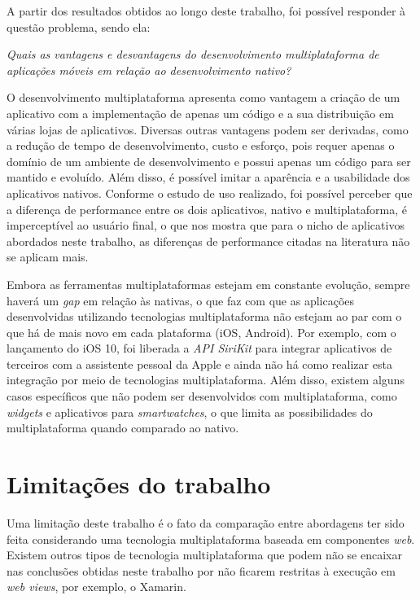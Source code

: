 A partir dos resultados obtidos ao longo deste trabalho, foi possível responder à questão problema, sendo ela:
\begin{center}
    \textit{Quais as vantagens e desvantagens do desenvolvimento multiplataforma de aplicações móveis em relação ao desenvolvimento nativo?}
\end{center}

O desenvolvimento multiplataforma apresenta como vantagem a criação de um aplicativo com a implementação de apenas um código e a sua distribuição em várias lojas de aplicativos. Diversas outras vantagens podem ser 
derivadas, como a redução de tempo de desenvolvimento, custo e esforço, pois requer apenas o domínio de um ambiente de desenvolvimento e possui apenas um código para ser mantido e evoluído. Além disso, é possível imitar 
a aparência e a usabilidade dos aplicativos nativos. Conforme o estudo de uso realizado, foi possível perceber que a diferença de performance entre os dois aplicativos, nativo e multiplataforma, é imperceptível ao usuário 
final, o que nos mostra que para o nicho de aplicativos abordados neste trabalho, as diferenças de performance citadas na literatura não se aplicam mais.

Embora as ferramentas multiplataformas estejam em constante evolução, sempre haverá um \textit{gap} em relação às nativas, o que faz com que as aplicações desenvolvidas utilizando tecnologias multiplataforma não estejam 
ao par com o que há de mais novo em cada plataforma (iOS, Android). Por exemplo, com o lançamento do iOS 10, foi liberada a \textit{API SiriKit} para integrar aplicativos de terceiros com a assistente pessoal da Apple e 
ainda não há como realizar esta integração por meio de tecnologias multiplataforma. Além disso, existem alguns casos específicos que não podem ser desenvolvidos com multiplataforma, como \textit{widgets} e aplicativos para 
\textit{smartwatches}, o que limita as possibilidades do multiplataforma quando comparado ao nativo.

\section{Limitações do trabalho} \label{section:limitacoestrabalho}
Uma limitação deste trabalho é o fato da comparação entre abordagens ter sido feita considerando uma tecnologia multiplataforma baseada em componentes \textit{web}. Existem outros tipos de tecnologia multiplataforma 
que podem não se encaixar nas conclusões obtidas neste trabalho por não ficarem restritas à execução em \textit{web views}, por exemplo, o Xamarin. 

